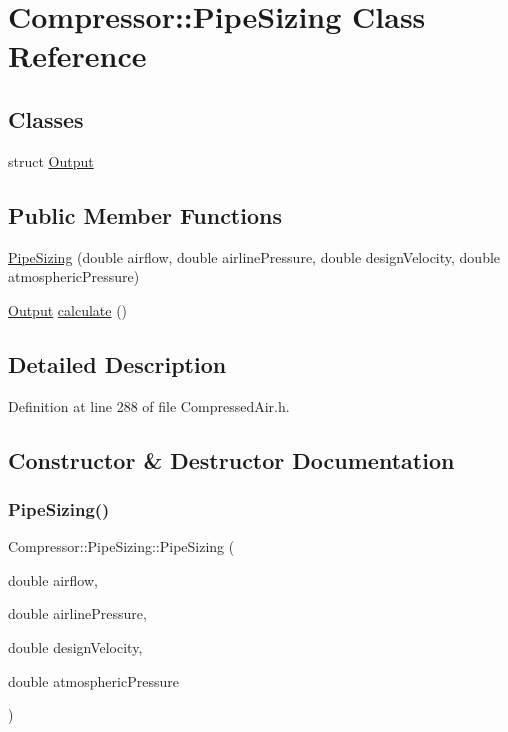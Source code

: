 \hypertarget{class_compressor_1_1_pipe_sizing}{}\section{Compressor\+:\+:Pipe\+Sizing Class Reference}
\label{class_compressor_1_1_pipe_sizing}
\subsection*{Classes}
\begin{DoxyCompactItemize}
\item 
struct \hyperlink{struct_compressor_1_1_pipe_sizing_1_1_output}{Output}
\end{DoxyCompactItemize}
\subsection*{Public Member Functions}
\begin{DoxyCompactItemize}
\item 
\hyperlink{class_compressor_1_1_pipe_sizing_a63d7a8e0780e80938489f160b5996abb}{Pipe\+Sizing} (double airflow, double airline\+Pressure, double design\+Velocity, double atmospheric\+Pressure)
\item 
\hyperlink{struct_compressor_1_1_pipe_sizing_1_1_output}{Output} \hyperlink{class_compressor_1_1_pipe_sizing_a9212c8d52ff658c412752cee18d6b28d}{calculate} ()
\end{DoxyCompactItemize}


\subsection{Detailed Description}


Definition at line 288 of file Compressed\+Air.\+h.



\subsection{Constructor \& Destructor Documentation}
\mbox{\label{class_compressor_1_1_pipe_sizing_a63d7a8e0780e80938489f160b5996abb}} 
\subsubsection{\texorpdfstring{Pipe\+Sizing()}{PipeSizing()}}
{\footnotesize\ttfamily Compressor\+::\+Pipe\+Sizing\+::\+Pipe\+Sizing (\begin{DoxyParamCaption}\item[{double}]{airflow,  }\item[{double}]{airline\+Pressure,  }\item[{double}]{design\+Velocity,  }\item[{double}]{atmospheric\+Pressure }\end{DoxyParamCaption})}

